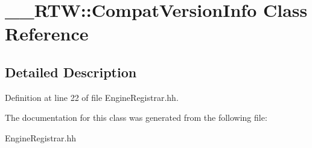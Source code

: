 \section{\-\_\-\-\_\-\-R\-T\-W\-:\-:Compat\-Version\-Info Class Reference}
\label{class____RTW_1_1CompatVersionInfo}


\subsection{Detailed Description}


Definition at line 22 of file Engine\-Registrar.\-hh.



The documentation for this class was generated from the following file\-:\begin{DoxyCompactItemize}
\item 
Engine\-Registrar.\-hh\end{DoxyCompactItemize}
